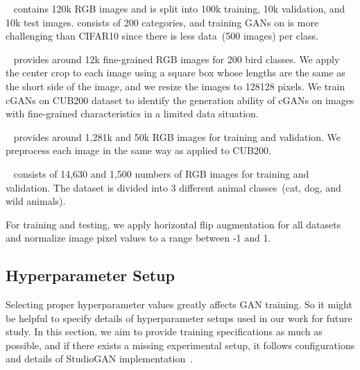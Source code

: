 \documentclass{article}
\begin{document}
\textbf{}~\cite{Tiny} contains 120k  RGB images and is split into 100k training, 10k validation, and 10k test images.  consists of 200 categories, and training GANs on  is more challenging than CIFAR10 since there is less data~(500 images) per class.

\textbf{}~\cite{WelinderEtal2010} provides around 12k fine-grained RGB images for 200 bird classes. We apply the center crop to each image using a square box whose lengths are the same as the short side of the image, and we resize the images to 128128 pixels. We train cGANs on CUB200 dataset to identify the generation ability of cGANs on images with fine-grained characteristics in a limited data situation.

\textbf{}~\cite{Deng2009ImageNetAL} provides around 1,281k and 50k RGB images for training and validation. We preprocess each image in the same way as applied to CUB200.

\textbf{}~\cite{choi2020starganv2} consists of 14,630 and 1,500 numbers of  RGB images for training and validation. The dataset is divided into 3 different animal classes~(cat, dog, and wild animals).

For training and testing, we apply horizontal flip augmentation for all datasets and normalize image pixel values to a range between -1 and 1.\\

\subsection{\large{Hyperparameter Setup}}
\label{hyperparameter_setup}

Selecting proper hyperparameter values greatly affects GAN training. So it might be helpful to specify details of hyperparameter setups used in our work for future study. In this section, we aim to provide training specifications as much as possible, and if there exists a missing experimental setup, it follows configurations and details of StudioGAN implementation~\cite{studiogan}.
\end{document}
